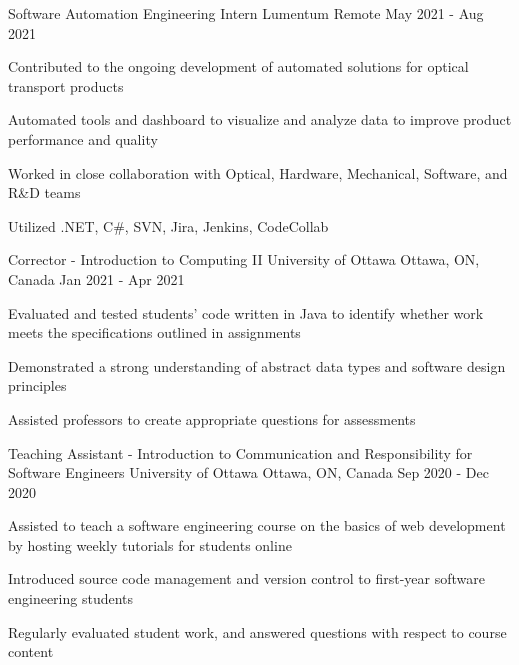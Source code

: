 \begin{cventries}
  \cventry
    {Software Automation Engineering Intern} %
    {Lumentum} %
    {Remote} %
    {May 2021 - Aug 2021} %
    {
      \begin{cvitems} %
\item Contributed to the ongoing development of automated solutions for optical transport products
\item Automated tools and dashboard to visualize and analyze data to improve product performance and quality
\item Worked in close collaboration with Optical, Hardware, Mechanical, Software, and R\&D teams
\item Utilized .NET, C\#, SVN, Jira, Jenkins, CodeCollab
      \end{cvitems}
    }
  \cventry
    {Corrector - Introduction to Computing II} %
    {University of Ottawa} %
    {Ottawa, ON, Canada} %
    {Jan 2021 - Apr 2021} %
    {
      \begin{cvitems} %
\item Evaluated and tested students' code written in Java to identify whether work meets the specifications outlined in assignments
\item Demonstrated a strong understanding of abstract data types and software design principles
\item Assisted professors to create appropriate questions for assessments
      \end{cvitems}
    }
  \cventry
    {Teaching Assistant - Introduction to Communication and Responsibility for Software Engineers} %
    {University of Ottawa} %
    {Ottawa, ON, Canada} %
    {Sep 2020 - Dec 2020} %
    {
      \begin{cvitems} %
\item Assisted to teach a software engineering course on the basics of web development by hosting weekly tutorials for students online
\item Introduced source code management and version control to first-year software engineering students
\item Regularly evaluated student work, and answered questions with respect to course content

\end{cvitems}}
\end{cventries}
